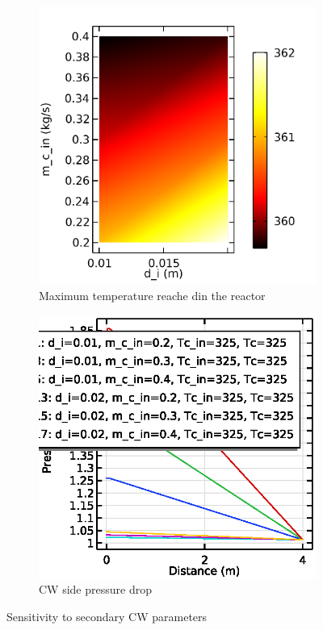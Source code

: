 \begin{figure}[h]
    \centering

    \begin{subfigure}{0.49\linewidth}
        \includegraphics[width=\linewidth]{figures/S2-maxT.png}
        \caption{Maximum temperature reache din the reactor}
        \label{fig:comsol-S2:maxT}
    \end{subfigure}
    \begin{subfigure}{0.49\linewidth}
        \includegraphics[width=\linewidth]{figures/S2-CW-Pdrop.eps}
        \caption{CW side pressure drop}
        \label{fig:comsol-S2:CW-Pdrop}
    \end{subfigure}

    \caption{Sensitivity to secondary CW parameters}
    \label{fig:comsol-S2}
\end{figure}

